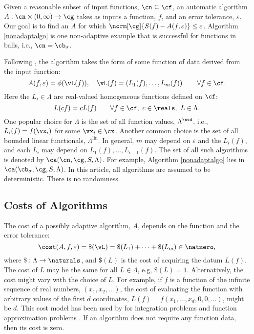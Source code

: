 \documentclass[]{elsarticle}
\DeclareMathOperator{\lin}{lin}
\theoremstyle{definition}
\theoremstyle{remark}
\begin{document}
Given a reasonable subset of input functions, $\cn \subseteq \cf$, an automatic algorithm $A:\cn\times(0,\infty) \to \cg$ takes as inputs a function, $f$, and an error tolerance, $\varepsilon$.  Our goal is to find an $A$ for which $\norm[\cg]{S(f)-A(f,\varepsilon)}\le \varepsilon$.  Algorithm \ref{nonadaptalgo} is one non-adaptive example that is successful for functions in balls, i.e., $\cn=\cb_{\sigma}$.

Following \cite[Section 3.2]{TraWasWoz88}, the algorithm takes the form of some function of data derived from the input function:
\begin{equation*}
\label{algoform}
A(f,\varepsilon) =  \phi(\vL(f)), \quad \vL(f) = \left(L_1(f), \ldots, L_m(f)\right) \qquad \forall f \in \cf.
\end{equation*}
Here the $L_i \in \Lambda$ are real-valued homogeneous functions defined on $\cf$:
\begin{equation*}
\label{dataassump}
L(cf) = cL(f) \qquad \forall f \in \cf, \ c \in \reals, \ L \in \Lambda.
\end{equation*}
One popular choice for $\Lambda$ is the set of all function values, $\Lambda^{\std}$, i.e., $L_i(f) = f(\vx_i)$ for some $\vx_i \in \cx$.  Another common choice is the set of all bounded linear functionals, $\Lambda^{\lin}$.  In general, $m$ may depend on  $\varepsilon$ and the $L_i(f)$, and each $L_i$ may depend on $L_1(f), \ldots, L_{i-1}(f)$.  The set of all such algorithms is denoted by $\ca(\cn,\cg,S,\Lambda)$. For example, Algorithm \ref{nonadaptalgo} lies in $\ca(\cb_{\sigma},\cg,S,\Lambda)$.  In this article, all algorithms are assumed to be deterministic.  There is no randomness.

\subsection{Costs of Algorithms} \label{AlgoCostsec}

The cost of a possibly adaptive algorithm, $A$, depends on the function and the error tolerance:
\[
\cost(A,f,\varepsilon) = \$(\vL) = \$(L_1) + \cdots +\$(L_m) \in \natzero,
\]
where $\$:\Lambda \to \naturals$, and $\$(L)$ is the cost of acquiring the datum $L(f)$. The cost of $L$ may be the same for all $L \in \Lambda$, e.g, $\$(L)=1$.  Alternatively, the cost might vary with the choice of $L$.  For example, if $f$ is a function of the infinite sequence of real numbers, $(x_1, x_2, \ldots)$, the cost of evaluating the function with arbitrary values of the first $d$ coordinates, $L(f)=f(x_1, \ldots, x_d, 0, 0, \ldots)$, might be $d$.  This cost model has been used by for integration problems \cite{HicMGRitNiu09a,KuoEtal10a,NiuHic09a,NiuHic09b,PlaWas11a} and function approximation problems \cite{Was13a,WasWoz11a,WasWoz11b}.  If an algorithm does not require any function data, then its cost is zero.
\end{document}
